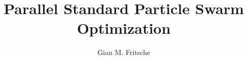 \documentclass[conference]{IEEEtran}
\begin{document}
%

\title{Parallel Standard Particle Swarm Optimization}


\author{Gian M. Fritsche}


% 








\maketitle

\end{document}

